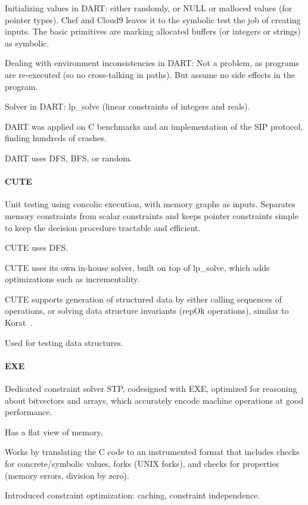 Initializing values in DART: either randomly, or NULL or malloced values (for pointer types).  Chef and Cloud9 leaves it to the symbolic test the job of creating inputs. The basic primitives are marking allocated buffers (or integers or strings) as symbolic.

Dealing with environment inconsistencies in DART: Not a problem, as programs are re-executed (so no cross-talking in paths).  But assume no side effects in the program.

Solver in DART: lp\_solve (linear constraints of integers and reals).

DART was applied on C benchmarks and an implementation of the SIP protocol, finding hundreds of crashes.

DART uses DFS, BFS, or random.

\paragraph{CUTE}

Unit testing using concolic execution, with memory graphs as inputs.  Separates memory constraints from scalar constraints and keeps pointer constraints simple to keep the decision procedure tractable and efficient.

CUTE uses DFS.

CUTE uses its own in-house solver, built on top of lp\_solve, which adds optimizations such as incrementality.

CUTE supports generation of structured data by either calling sequences of operations, or solving data structure invariants (repOk operations), similar to Korat~\cite{boyapati:korat}.

Used for testing data structures.

\paragraph{EXE}

Dedicated constraint solver STP, codesigned with EXE, optimized for reasoning about bitvectors and arrays, which accurately encode machine operations at good performance.

Has a flat view of memory.

Works by translating the C code to an instrumented format that includes checks for concrete/symbolic values, forks (UNIX forks), and checks for properties (memory errors, division by zero).

Introduced constraint optimization: caching, constraint independence.

